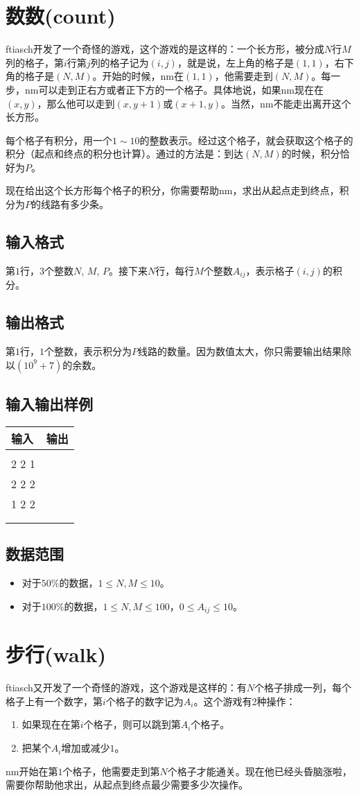 \documentclass[a4paper]{article}
\newcommand{\problem}{\section}
\newcommand{\inputformat}{\subsection{输入格式}}
\newcommand{\outputformat}{\subsection{输出格式}}
\newcommand{\sample}[2]{
\subsection{输入输出样例}
\begin{tabular}{|l|l|}
    \hline
    输入 & 输出 \\
    \hline
    \begin{minipage}[t]{200pt}
        \begin{ttfamily} #1 \end{ttfamily}
    \end{minipage} &
    \begin{minipage}[t]{200pt}
        \begin{ttfamily} #2 \end{ttfamily}
    \end{minipage} \\
    \hline
\end{tabular}
\vspace{1ex}
\par
}
\newcommand{\dataset}{\subsection{数据范围}}
\begin{document}
\problem{数数(count)}

ftiasch开发了一个奇怪的游戏，这个游戏的是这样的：一个长方形，被分成$N$行$M$列的格子，第$i$行第$j$列的格子记为$(i, j)$，就是说，左上角的格子是$(1, 1)$，右下角的格子是$(N, M)$。开始的时候，nm在$(1, 1)$，他需要走到$(N, M)$。每一步，nm可以走到正右方或者正下方的一个格子。具体地说，如果nm现在在$(x, y)$，那么他可以走到$(x, y + 1)$或$(x + 1, y)$。当然，nm不能走出离开这个长方形。

每个格子有积分，用一个$1 \sim 10$的整数表示。经过这个格子，就会获取这个格子的积分（起点和终点的积分也计算）。通过的方法是：到达$(N, M)$的时候，积分恰好为$P$。

现在给出这个长方形每个格子的积分，你需要帮助nm，求出从起点走到终点，积分为$P$的线路有多少条。

\inputformat{}

第$1$行，$3$个整数$N$, $M$, $P$。接下来$N$行，每行$M$个整数$A_{ij}$，表示格子$(i, j)$的积分。

\outputformat{}

第$1$行，$1$个整数，表示积分为$P$线路的数量。因为数值太大，你只需要输出结果除以$(10^9 + 7)$的余数。

\sample{
3 3 9 \\
2 2 1 \\
2 2 2 \\
1 2 2 \\
}{
2 \\
}

\dataset{}

\begin{itemize}
    \item 对于$50\%$的数据，$1 \leq N, M \leq 10$。

    \item 对于$100\%$的数据，$1 \leq N, M \leq 100$，$0 \leq A_{ij} \leq 10$。
\end{itemize}

\problem{步行(walk)}

ftiasch又开发了一个奇怪的游戏，这个游戏是这样的：有$N$个格子排成一列，每个格子上有一个数字，第$i$个格子的数字记为$A_i$。这个游戏有2种操作：

\begin{enumerate}
    \item 如果现在在第$i$个格子，则可以跳到第$A_i$个格子。

    \item 把某个$A_i$增加或减少$1$。
\end{enumerate}

nm开始在第$1$个格子，他需要走到第$N$个格子才能通关。现在他已经头昏脑涨啦，需要你帮助他求出，从起点到终点最少需要多少次操作。
\end{document}
